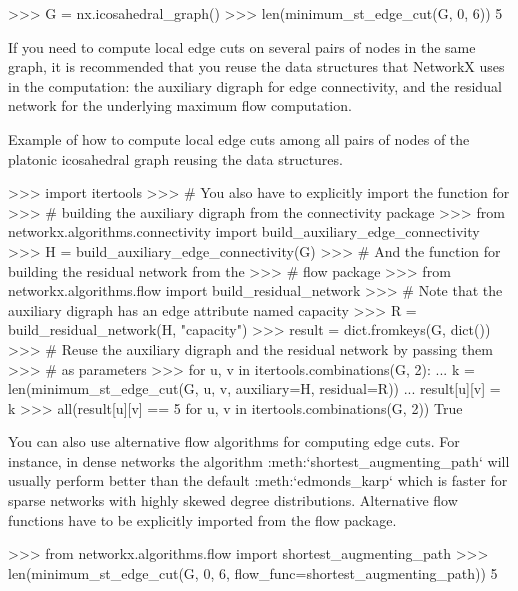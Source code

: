\begin{DoxyVerb}
>>> G = nx.icosahedral_graph()
>>> len(minimum_st_edge_cut(G, 0, 6))
5

If you need to compute local edge cuts on several pairs of
nodes in the same graph, it is recommended that you reuse the
data structures that NetworkX uses in the computation: the
auxiliary digraph for edge connectivity, and the residual
network for the underlying maximum flow computation.

Example of how to compute local edge cuts among all pairs of
nodes of the platonic icosahedral graph reusing the data
structures.

>>> import itertools
>>> # You also have to explicitly import the function for
>>> # building the auxiliary digraph from the connectivity package
>>> from networkx.algorithms.connectivity import build_auxiliary_edge_connectivity
>>> H = build_auxiliary_edge_connectivity(G)
>>> # And the function for building the residual network from the
>>> # flow package
>>> from networkx.algorithms.flow import build_residual_network
>>> # Note that the auxiliary digraph has an edge attribute named capacity
>>> R = build_residual_network(H, "capacity")
>>> result = dict.fromkeys(G, dict())
>>> # Reuse the auxiliary digraph and the residual network by passing them
>>> # as parameters
>>> for u, v in itertools.combinations(G, 2):
...     k = len(minimum_st_edge_cut(G, u, v, auxiliary=H, residual=R))
...     result[u][v] = k
>>> all(result[u][v] == 5 for u, v in itertools.combinations(G, 2))
True

You can also use alternative flow algorithms for computing edge
cuts. For instance, in dense networks the algorithm
:meth:`shortest_augmenting_path` will usually perform better than
the default :meth:`edmonds_karp` which is faster for sparse
networks with highly skewed degree distributions. Alternative flow
functions have to be explicitly imported from the flow package.

>>> from networkx.algorithms.flow import shortest_augmenting_path
>>> len(minimum_st_edge_cut(G, 0, 6, flow_func=shortest_augmenting_path))
5\end{DoxyVerb}
 \mbox{\label{namespacenetworkx_1_1algorithms_1_1connectivity_1_1cuts_a3a3ae336abcce0cc7ca6aac034920272}} 
